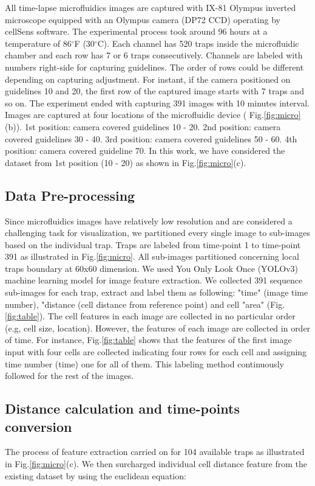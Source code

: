 \documentclass[conference]{IEEEtran}
\begin{document}
All time-lapse microfluidics images are captured with IX-81 Olympus inverted microscope equipped with an Olympus camera (DP72 CCD) operating by cellSens software. The experimental process took around 96 hours at a temperature of 86$^{\circ}$F (30$^{\circ}$C). Each channel has 520 traps inside the microfluidic chamber and each row has 7 or 6 traps consecutively. Channels are labeled with numbers right-side for capturing guidelines. The order of rows could be different depending on capturing adjustment. For instant, if the camera positioned on guidelines 10 and 20, the first row of the captured image starts with 7 traps and so on. The experiment ended with capturing 391 images with 10 minutes interval. Images are captured at four locations of the microfluidic device ( Fig.\ref{fig:micro}(b)). 1st position: camera covered guidelines 10 - 20. 2nd position: camera covered guidelines 30 - 40. 3rd position: camera covered guidelines 50 - 60. 4th position: camera covered guideline 70. In this work, we have considered the dataset from 1st position (10 - 20) as shown in Fig.\ref{fig:micro}(c).

\subsection{Data Pre-processing}
Since microfluidics images have relatively low resolution and are considered a challenging task for visualization, we partitioned every single image to sub-images based on the individual trap. Traps are labeled from time-point 1 to time-point 391 as illustrated in Fig.\ref{fig:micro}. All sub-images partitioned concerning local traps boundary at 60x60 dimension. We used You Only Look Once (YOLOv3) \cite{ref20} machine learning model for image feature extraction. We collected 391 sequence sub-images for each trap, extract and label them as following: "time" (image time number), "distance (cell distance from reference point) and cell "area" (Fig.\ref{fig:table}). The cell features in each image are collected in no particular order (e.g, cell size, location). However, the features of each image are collected in order of time. For instance, Fig.\ref{fig:table} shows that the features of the first image input with four cells are collected indicating four rows for each cell and assigning time number (time) one for all of them. This labeling method continuously followed for the rest of the images.

\subsection{Distance calculation and time-points conversion}
The process of feature extraction carried on for 104 available traps as illustrated in Fig.\ref{fig:micro}(c). We then surcharged individual cell distance feature from the existing dataset by using the euclidean equation:
\end{document}
